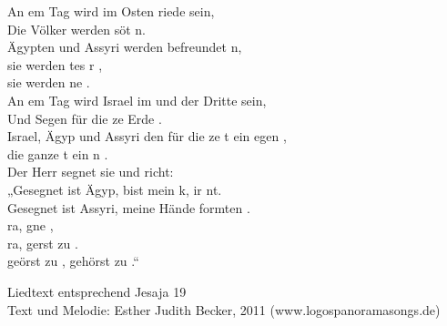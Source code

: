 
An em Tag wird im Osten riede sein,\\
Die Völker werden söt n.\\

Ägypten und Assyri werden befreundet n,\\
 sie werden tes r ,\\
 sie werden ne  .\\

An em Tag wird Israel im und der Dritte sein,\\
Und Segen für die ze Erde .\\
Israel, Ägyp und Assyri den für die ze t ein egen ,\\
 die ganze t ein n .\\

Der Herr segnet sie und richt:\\
„Gesegnet ist Ägyp,  bist mein k,  ir nt.\\
Gesegnet ist Assyri, meine Hände formten .\\
ra,  gne ,\\ 
ra,  gerst zu .\\
 geörst zu ,  gehörst zu .“\\

\begin{footnotesize}
Liedtext entsprechend Jesaja 19\\
Text und Melodie: Esther Judith Becker, 2011 (www.logospanoramasongs.de)
\end{footnotesize}